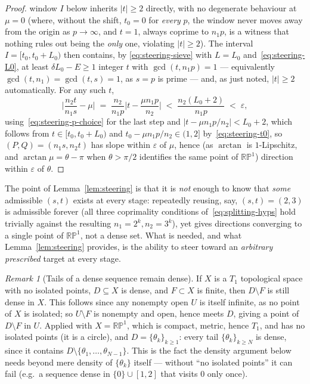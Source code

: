 \documentclass[a4paper,11pt,oneside,reqno]{amsart}
\theoremstyle{definition}
\theoremstyle{remark}
\newtheorem{remark}[definition]{Remark}
\theoremstyle{plain}
\newcommand{\RP}{\mathbb{RP}^1}
\begin{document}
\begin{proof}
  window \(I\) below inherits \(|t|\ge2\) directly, with no degenerate behaviour at \(\mu=0\) (where,
  without the shift, \(t_0=0\) for \emph{every} \(p\), the window never moves away from the origin as
  \(p\to\infty\), and \(t=1\), always coprime to \(n_1p\), is a witness that nothing rules out being
  the \emph{only} one, violating \(|t|\ge2\)). The interval \(I=[t_0,t_0+L_0)\) then contains, by
  \eqref{eq:steering-sieve} with \(L=L_0\) and~\eqref{eq:steering-L0}, at least \(\delta L_0-E\ge1\)
  integer \(t\) with \(\gcd(t,n_1p)=1\) --- equivalently \(\gcd(t,n_1)=\gcd(t,s)=1\), as \(s=p\) is prime
  --- and, as just noted, \(|t|\ge2\) automatically. For any such \(t\),
  \begin{equation}
    \label{eq:steering-final-bound}
    \Big|\frac{n_2t}{n_1s}-\mu\Big| \;=\; \frac{n_2}{n_1p}\Big|t-\frac{\mu n_1p}{n_2}\Big| \;<\;
    \frac{n_2(L_0+2)}{n_1p} \;<\; \varepsilon,
  \end{equation}
  using~\eqref{eq:steering-p-choice} for the last step and \(\big|t-\mu n_1p/n_2\big|<L_0+2\), which
  follows from \(t\in[t_0,t_0+L_0)\) and \(t_0-\mu n_1p/n_2\in(1,2]\) by~\eqref{eq:steering-t0}, so
  \((P,Q)=(n_1s,n_2t)\) has slope within \(\varepsilon\) of \(\mu\), hence (as \(\arctan\) is
  \(1\)-Lipschitz, and \(\arctan\mu=\theta-\pi\) when \(\theta>\pi/2\) identifies the same point of
  \(\RP\)) direction within \(\varepsilon\) of \(\theta\).
\end{proof}

The point of Lemma~\ref{lem:steering} is that it is \emph{not} enough to know that \emph{some}
admissible \((s,t)\) exists at every stage: repeatedly reusing, say, \((s,t)=(2,3)\) is admissible
forever (all three coprimality conditions of~\eqref{eq:splitting-hyps} hold trivially against the
resulting \(n_1=2^{k},n_2=3^{k}\)), yet gives directions converging to a single point of \(\RP\), not a
dense set. What is needed, and what Lemma~\ref{lem:steering} provides, is the ability to steer
toward an \emph{arbitrary prescribed} target at every stage.

\begin{remark}[Tails of a dense sequence remain dense]
  \label{rem:tail-density}
  If \(X\) is a \(T_1\) topological space with no isolated points, \(D\subseteq X\) is dense, and
  \(F\subset X\) is finite, then \(D\setminus F\) is still dense in \(X\). This follows since any
  nonempty open \(U\) is itself infinite, as no point of \(X\) is isolated; so \(U\setminus F\) is
  nonempty and open, hence meets \(D\), giving a point of \(D\setminus F\) in \(U\). Applied with
  \(X=\RP\), which is compact, metric, hence \(T_1\), and has no isolated points (it is a circle), and
  \(D=\{\theta_k\}_{k\ge1}\): every tail
  \(\{\theta_k\}_{k\ge N}\) is dense, since it contains \(D\setminus\{\theta_1,\dots,\theta_{N-1}\}\).
  This is the fact the density argument below needs beyond mere density of \(\{\theta_k\}\) itself
  --- without ``no isolated points'' it can fail (e.g.\ a sequence dense in \(\{0\}\cup[1,2]\) that
  visits \(0\) only once).
\end{remark}
\end{document}

